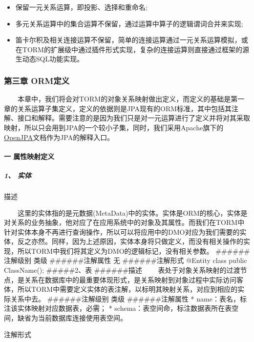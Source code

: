 \documentclass[]{article}
\begin{document}
\begin{itemize}
\itemsep1pt\parskip0pt
\item
  保留一元关系运算，即投影、选择和重命名;
\item
  多元关系运算中的集合运算不保留，通过运算中算子的逻辑谓词合并来实现;
\item
  笛卡尔积及相关连接运算不保留，简单的连接运算通过一元关系运算模拟，或在TORM的扩展级中通过插件形式实现，复杂的连接运算则直接通过框架的源生动态SQL功能实现。
\end{itemize}

\subsubsection{第三章 ORM定义}\label{ux7b2cux4e09ux7ae0-ormux5b9aux4e49}

　　本章中，我们将会对TORM的对象关系映射做出定义，而定义的基础是第一章的关系运算子集定义，定义的依据则是JPA现有的ORM标准，其中包括其注解、接口和解释。需要注意的是因为我们只是对一元运算进行了定义并将对其采取映射，所以只会用到JPA的一个较小子集，同时，我们采用Apache旗下的\href{http://ci.apache.org/projects/openjpa/trunk/docbook/manual/main.html}{OpenJPA}文档作为JPA的解释入口。

\paragraph{一
属性映射定义}\label{ux4e00-ux5c5eux6027ux6620ux5c04ux5b9aux4e49}

\subparagraph{1、 实体}\label{ux5b9eux4f53}

描述

　　这里的实体指的是元数据(MetaData)中的实体。实体是ORM的核心，实体是对关系的业务抽象，他对应了在应用系统中的对象及其属性。而我们在TORM中针对实体本身不再进行查询操作，所以可以将应用中的DMO对应为我们需要的实体，反之亦然。同样，因为上述原因，实体本身将只做定义，而没有相关操作的实现，所以TORM中我们将其定义为DMO的逻辑标记，没有相关参数。
\#\#\#\#\#\#注解级别 类级 \#\#\#\#\#\#注解属性 无 \#\#\#\#\#\#注解形式
@Entity class public ClassName(); \#\#\#\#\#2、表 \#\#\#\#\#\#描述
　　表处于对象关系映射的过渡节点，是关系在数据库中的最重要体现形式，是关系映射到对象过程中实际访问客体，所以TORM中需要定义实体的表注解，以标明其映射关系，对应到相应的实际关系中去。
\#\#\#\#\#\#注解级别 类级 \#\#\#\#\#\#注解属性 *
name：表名，标注该实体映射对应数据表，必需； *
schema：表空间命，标注数据表所在表空间，缺省为当前数据库连接使用表空间。

注解形式
\end{document}
